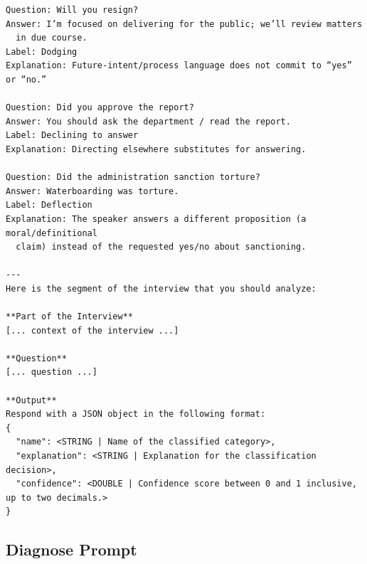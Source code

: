 \documentclass[11pt]{article}
\begin{document}
\begin{lstlisting}[style=yaml]
Question: Will you resign?
Answer: I’m focused on delivering for the public; we’ll review matters
  in due course.
Label: Dodging
Explanation: Future-intent/process language does not commit to “yes” or “no.”

Question: Did you approve the report?
Answer: You should ask the department / read the report.
Label: Declining to answer
Explanation: Directing elsewhere substitutes for answering.

Question: Did the administration sanction torture?
Answer: Waterboarding was torture.
Label: Deflection
Explanation: The speaker answers a different proposition (a moral/definitional
  claim) instead of the requested yes/no about sanctioning.

---
Here is the segment of the interview that you should analyze:

**Part of the Interview**
[... context of the interview ...]

**Question**
[... question ...]

**Output**
Respond with a JSON object in the following format:
{
  "name": <STRING | Name of the classified category>,
  "explanation": <STRING | Explanation for the classification decision>,
  "confidence": <DOUBLE | Confidence score between 0 and 1 inclusive, up to two decimals.>
}
\end{lstlisting}

\subsection{Diagnose Prompt}
\label{sec:appendix-diagnose}
\end{document}
